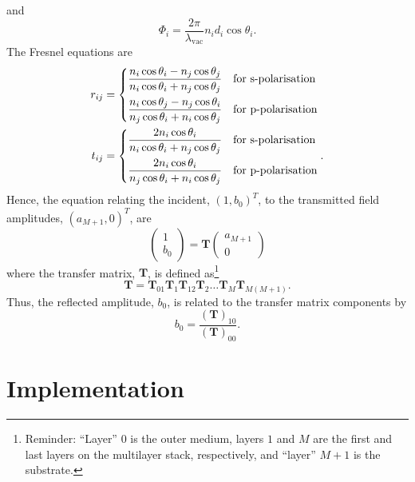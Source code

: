 \documentclass[]{article}
\begin{document}
	and 
	\begin{equation}
		\Phi_i=\frac{2\pi}{\lambda_\text{vac}}n_id_i\cos\theta_i.
	\end{equation}
	The Fresnel equations are 
	\begin{align}
		r_{ij}&=
		\begin{dcases}
			\frac{n_i \cos\theta_i - n_j \cos\theta_j}{n_i \cos\theta_i + n_j \cos\theta_j}&\text{for s-polarisation}\\
			\frac{n_i \cos\theta_j-n_j \cos\theta_i}{n_j \cos\theta_i + n_i \cos\theta_j}&\text{for p-polarisation}
		\end{dcases}\\
		t_{ij}&=
		\begin{dcases}
			\frac{2 n_i \cos\theta_i}{n_i \cos\theta_i + n_j \cos\theta_j}&\text{for s-polarisation}\\
			\frac{2 n_i \cos\theta_i}{n_j \cos\theta_i + n_i \cos\theta_j}&\text{for p-polarisation}
		\end{dcases}.
	\end{align}
	Hence, the equation relating the incident, $(1, b_0)^T$, to the transmitted field amplitudes, $(a_{M+1},0)^T$, are
	\begin{equation}
		\begin{pmatrix}
			1\\b_0
		\end{pmatrix}=
		\mathbf{T}
		\begin{pmatrix}
			a_{M+1}\\0
		\end{pmatrix}
	\end{equation}
	where the transfer matrix, $\mathbf{T}$, is defined as\footnote{Reminder: ``Layer'' $0$ is the outer medium, layers $1$ and $M$ are the first and last layers on the multilayer stack, respectively, and ``layer'' $M+1$ is the substrate.}
	\begin{equation}
		\mathbf{T}=\mathbf{T}_{01}\mathbf{T}_1\mathbf{T}_{12}\mathbf{T}_2\dots\mathbf{T}_{M}\mathbf{T}_{M(M+1)}.
	\end{equation}
	Thus, the reflected amplitude, $b_0$, is related to the transfer matrix components by
	\begin{equation}
		b_0=\frac{(\mathbf{T})_{10}}{(\mathbf{T})_{00}}.
	\end{equation}

\section{Implementation}
	
%	
%	
	
\end{document}
